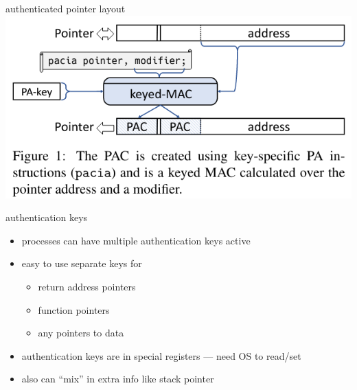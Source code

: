 \begin{frame}[fragile]{authenticated pointer layout}
\includegraphics[width=\textwidth]{../cfi/arm-enc-ptr-fig}
\end{frame}

\begin{frame}{authentication keys}
    \begin{itemize}
    \item processes can have multiple authentication keys active
    \item easy to use separate keys for
        \begin{itemize}
        \item return address pointers
        \item function pointers
        \item any pointers to data
        \end{itemize}
    \item authentication keys are in special registers --- need OS to read/set
    \vspace{.5cm}
    \item also can ``mix'' in extra info like stack pointer
    \end{itemize}
\end{frame}

